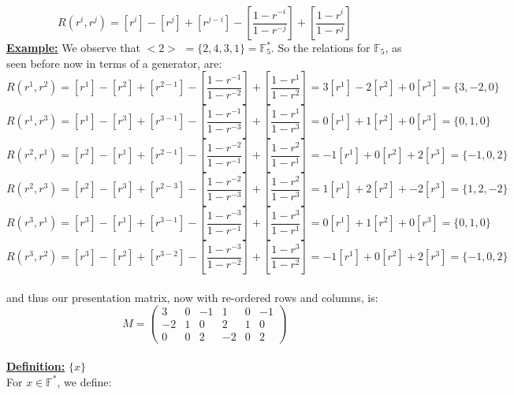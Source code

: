 \documentclass[11pt]{article}
\theoremstyle{plain}
\theoremstyle{definition}
\begin{document}
\begin{equation*}
R(r^{i},r^{j}) = [r^{i}] - [r^{j}] + [r^{j-i}] - [\frac{1-r^{-i}}{1-r^{-j}}] + [\frac{1-r^{i}}{1-r^{j}}]
\end{equation*}
\textbf{\underline{Example:}}  We observe that $<2>$  $= \{2,4,3,1\} = \mathbb{F}_{5} ^{*}$.  So the relations for $\mathbb{F}_5$, as seen before now in terms of a generator, are: \\
\begin{equation*}
R(r^{1},r^{2}) = [r^{1}] - [r^{2}] + [r^{2-1}] - [\frac{1-r^{-1}}{1-r^{-2}}] + [\frac{1-r^{1}}{1-r^{2}}] = 3[r^1] -2[r^2]  + 0[r^3] = \{3,-2,0\}
\end{equation*}
\begin{equation*}
R(r^{1},r^{3}) = [r^{1}] - [r^{3}] + [r^{3-1}] - [\frac{1-r^{-1}}{1-r^{-3}}] + [\frac{1-r^{1}}{1-r^{3}}] = 0[r^1] +1[r^2]  + 0[r^3] = \{0,1,0\}
\end{equation*}
\begin{equation*}
R(r^{2},r^{1}) = [r^{2}] - [r^{1}] + [r^{2-1}] - [\frac{1-r^{-2}}{1-r^{-1}}] + [\frac{1-r^{2}}{1-r^{1}}] = -1[r^1] +0[r^2]  + 2[r^3] = \{-1,0,2\}
\end{equation*}
\begin{equation*}
R(r^{2},r^{3}) = [r^{2}] - [r^{3}] + [r^{2-3}] - [\frac{1-r^{-2}}{1-r^{-3}}] + [\frac{1-r^{2}}{1-r^{3}}] = 1[r^1] +2[r^2]  + -2[r^3] = \{1,2,-2\}
\end{equation*}
\begin{equation*}
R(r^{3},r^{1}) = [r^{3}] - [r^{1}] + [r^{3-1}] - [\frac{1-r^{-3}}{1-r^{-1}}] + [\frac{1-r^{3}}{1-r^{1}}] = 0[r^1] +1[r^2]  + 0[r^3] = \{0,1,0\}
\end{equation*}
\begin{equation*}
R(r^{3},r^{2}) = [r^{3}] - [r^{2}] + [r^{3-2}] - [\frac{1-r^{-3}}{1-r^{-2}}] + [\frac{1-r^{3}}{1-r^{2}}] = -1[r^1]+0[r^2]  + 2[r^3] = \{-1,0,2\}
\end{equation*}
\\
and thus our presentation matrix, now with re-ordered rows and columns, is:
\\
\[ M = \left( \begin{array}{cccccc}
3  & 0  & -1 &  1 &   0 &  -1\\
-2 &   1 &  0 & 2  & 1 & 0  \\
0  & 0  & 2 &  -2  & 0 & 2   \end{array} \right)\]
\\
\textbf{\underline{Definition:}} $ \{ x \}$ \\ 
For $x \in \mathbb{F}^*$, we define:
\end{document}
